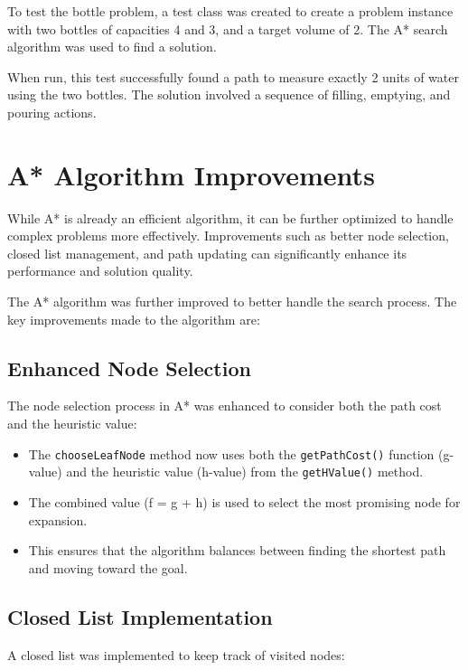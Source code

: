 \documentclass[12pt,a4paper]{article}
\newenvironment{infobox}[1]
  {\begin{tcolorbox}[colback=boxcolor,colframe=sectioncolor,title=#1,fonttitle=\bfseries]}
  {\end{tcolorbox}}
\begin{document}
To test the bottle problem, a test class was created to create a problem instance with two bottles of capacities 4 and 3, and a target volume of 2. The A* search algorithm was used to find a solution.

When run, this test successfully found a path to measure exactly 2 units of water using the two bottles. The solution involved a sequence of filling, emptying, and pouring actions.

\section{A* Algorithm Improvements}

\begin{infobox}{Why Improve A*?}
While A* is already an efficient algorithm, it can be further optimized to handle complex problems more effectively. Improvements such as better node selection, closed list management, and path updating can significantly enhance its performance and solution quality.
\end{infobox}

The A* algorithm was further improved to better handle the search process. The key improvements made to the algorithm are:

\subsection{Enhanced Node Selection}

The node selection process in A* was enhanced to consider both the path cost and the heuristic value:

\begin{itemize}
    \item The \texttt{chooseLeafNode} method now uses both the \texttt{getPathCost()} function (g-value) and the heuristic value (h-value) from the \texttt{getHValue()} method.
    \item The combined value (f = g + h) is used to select the most promising node for expansion.
    \item This ensures that the algorithm balances between finding the shortest path and moving toward the goal.
\end{itemize}

\subsection{Closed List Implementation}

A closed list was implemented to keep track of visited nodes:
\end{document}
